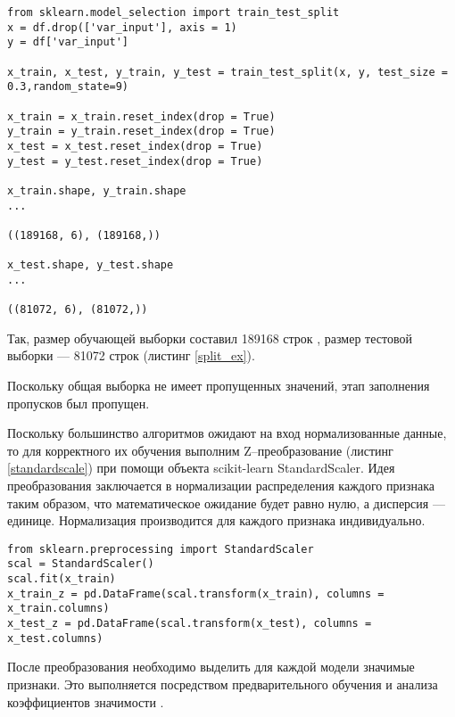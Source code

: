 \begin{lstlisting}
from sklearn.model_selection import train_test_split
x = df.drop(['var_input'], axis = 1)
y = df['var_input']

x_train, x_test, y_train, y_test = train_test_split(x, y, test_size = 0.3,random_state=9)

x_train = x_train.reset_index(drop = True)
y_train = y_train.reset_index(drop = True)
x_test = x_test.reset_index(drop = True)
y_test = y_test.reset_index(drop = True)

x_train.shape, y_train.shape
...

((189168, 6), (189168,))

x_test.shape, y_test.shape
...

((81072, 6), (81072,))
\end{lstlisting}
Так, размер обучающей выборки составил 189168 строк , размер тестовой выборки --- 81072 строк (листинг \ref{split_ex}).

Поскольку общая выборка не имеет пропущенных значений, этап заполнения пропусков был пропущен.

Поскольку большинство алгоритмов ожидают на вход нормализованные данные, то для корректного их обучения выполним Z--преобразование (листинг \ref{standardscale}) при помощи объекта scikit-learn StandardScaler. Идея преобразования заключается в нормализации распределения каждого признака таким образом, что математическое ожидание будет равно нулю, а дисперсия --- единице. Нормализация производится для каждого признака индивидуально.
\begin{lstlisting}
from sklearn.preprocessing import StandardScaler
scal = StandardScaler()
scal.fit(x_train)
x_train_z = pd.DataFrame(scal.transform(x_train), columns = x_train.columns)
x_test_z = pd.DataFrame(scal.transform(x_test), columns = x_test.columns)
\end{lstlisting}
После преобразования необходимо выделить для каждой модели значимые признаки. Это выполняется посредством предварительного обучения и анализа коэффициентов значимости \cite{hackeling2017mastering}.


